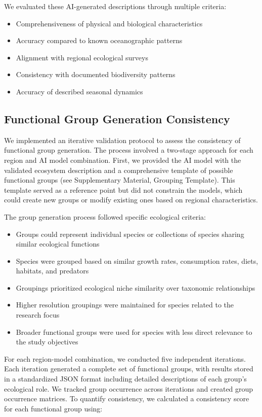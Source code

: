 We evaluated these AI-generated descriptions through multiple criteria:
\begin{itemize}
    \item Comprehensiveness of physical and biological characteristics
    \item Accuracy compared to known oceanographic patterns
    \item Alignment with regional ecological surveys
    \item Consistency with documented biodiversity patterns
    \item Accuracy of described seasonal dynamics
\end{itemize}

\subsection{Functional Group Generation Consistency}
We implemented an iterative validation protocol to assess the consistency of functional group generation. The process involved a two-stage approach for each region and AI model combination. First, we provided the AI model with the validated ecosystem description and a comprehensive template of possible functional groups (see Supplementary Material, Grouping Template). This template served as a reference point but did not constrain the models, which could create new groups or modify existing ones based on regional characteristics.

The group generation process followed specific ecological criteria:
\begin{itemize}
    \item Groups could represent individual species or collections of species sharing similar ecological functions
    \item Species were grouped based on similar growth rates, consumption rates, diets, habitats, and predators
    \item Groupings prioritized ecological niche similarity over taxonomic relationships
    \item Higher resolution groupings were maintained for species related to the research focus
    \item Broader functional groups were used for species with less direct relevance to the study objectives
\end{itemize}

For each region-model combination, we conducted five independent iterations. Each iteration generated a complete set of functional groups, with results stored in a standardized JSON format including detailed descriptions of each group's ecological role. We tracked group occurrence across iterations and created group occurrence matrices. To quantify consistency, we calculated a consistency score for each functional group using:

